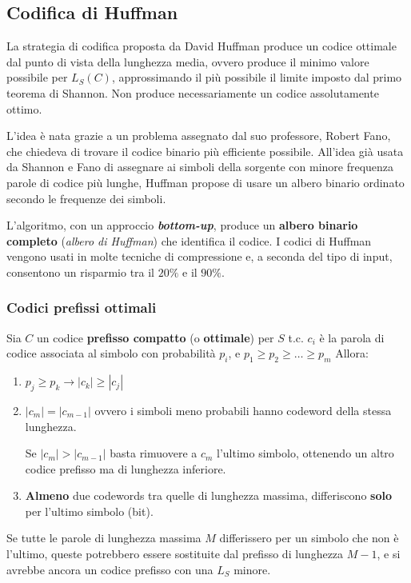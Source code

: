 \subsection{Codifica di Huffman}
La strategia di codifica proposta da David Huffman produce un codice ottimale dal punto di vista della lunghezza media, ovvero produce il minimo valore possibile per $L_S(C)$, approssimando il più possibile il limite imposto dal primo teorema di Shannon. Non produce necessariamente un codice assolutamente ottimo.

L'idea è nata grazie a un problema assegnato dal suo professore, Robert Fano, che chiedeva di trovare il codice binario più efficiente possibile.
All'idea già usata da Shannon e Fano di assegnare ai simboli della sorgente con minore frequenza parole di codice più lunghe, Huffman propose di usare un albero binario ordinato secondo le frequenze dei simboli.


L'algoritmo, con un approccio \textit{\textbf{bottom-up}}, produce un \textbf{albero binario completo} (\textit{albero di Huffman}) che identifica il codice. I codici di Huffman vengono usati in molte tecniche di compressione e, a seconda del tipo di input, consentono un risparmio tra il $20\%$ e il $90\%$.

\subsubsection{Codici prefissi ottimali}
Sia $C$ un codice \textbf{prefisso compatto} (o \textbf{ottimale}) per $S$ \mbox{t.c.} $c_i$ è la parola di codice associata al simbolo con probabilità $p_i$, e $p_1 \geq p_2 \geq \dots \geq p_m$
Allora:
\begin{enumerate}
    \item $p_j \geq p_k \to |c_k| \geq |c_j|$
    \item $|c_m| = |c_{m-1}|$ ovvero i simboli meno probabili hanno codeword della stessa lunghezza.
    
    Se $|c_m| > |c_{m-1}|$ basta rimuovere a $c_m$ l'ultimo simbolo, ottenendo un altro codice prefisso ma di lunghezza inferiore.
    \item \textbf{Almeno} due codewords tra quelle di lunghezza massima, differiscono \textbf{solo} per l'ultimo simbolo (bit).    
\end{enumerate}
Se tutte le parole di lunghezza massima $M$ differissero per un simbolo che non è l'ultimo, queste potrebbero essere sostituite dal prefisso di lunghezza $M-1$, e si avrebbe ancora un codice prefisso con una $L_S$ minore.

